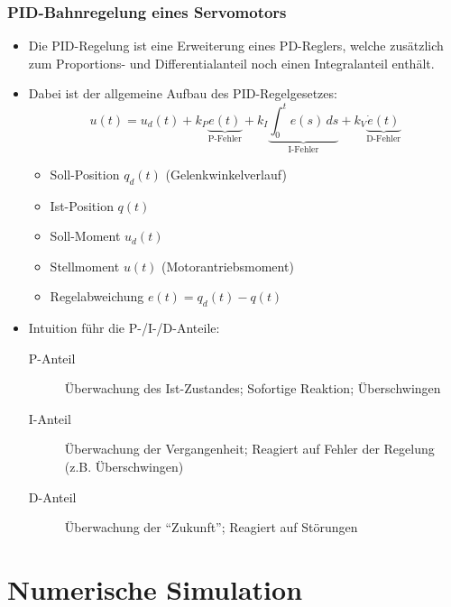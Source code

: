         \subsection{PID-Bahnregelung eines Servomotors} %
            \begin{itemize}
            	\item Die PID-Regelung ist eine Erweiterung eines PD-Reglers, welche zusätzlich zum Proportions- und Differentialanteil noch einen Integralanteil enthält.
            	\item Dabei ist der allgemeine Aufbau des PID-Regelgesetzes:
                	\begin{equation*}
	                	u(t) = u _ d (t) + k _ P \underbrace{e(t)}_{\text{P-Fehler}} + k _ I \underbrace{\int_{0}^{t} \! e(s) \, ds}_{\text{I-Fehler}} + k _ V \underbrace{\dot{e} (t)}_{\text{D-Fehler}}
                	\end{equation*}
                	\begin{itemize}
                		\item Soll-Position \( q _ d (t) \) (Gelenkwinkelverlauf)
                		\item Ist-Position \( q (t) \)
                		\item Soll-Moment \( u _ d (t) \)
                		\item Stellmoment \( u(t) \) (Motorantriebsmoment)
                		\item Regelabweichung \( e(t) = q _ d (t) - q(t) \)
                	\end{itemize}
                \item Intuition führ die P-/I-/D-Anteile:
	                \begin{description}
	                	\item[P-Anteil] Überwachung des Ist-Zustandes; Sofortige Reaktion; Überschwingen
	                	\item[I-Anteil] Überwachung der Vergangenheit; Reagiert auf Fehler der Regelung (z.B. Überschwingen)
	                	\item[D-Anteil] Überwachung der \enquote{Zukunft}; Reagiert auf Störungen
	                \end{description}
            \end{itemize}

\chapter{Numerische Simulation} %
    \label{c:numerischesimulation}

